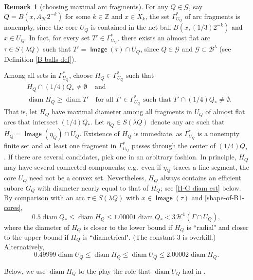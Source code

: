 \documentclass[12pt]{amsart}
\numberwithin{equation}{section}
\theoremstyle{plain}
\theoremstyle{definition}
\newtheorem{remark}[theorem]{Remark}
\def\ZZ{\mathbb{Z}}
\newcommand{\diam}{\mathop\mathrm{diam}\nolimits}
\newcommand{\Haus}{\mathcal{H}}
\newcommand{\Image}{\mathop\mathsf{Image}\nolimits}
\numberwithin{figure}{section}
\begin{document}
\begin{remark}[choosing maximal arc fragments] \label{r:maximal-fragments}
 For any $Q\in\mathscr{G}$, say $Q=B(x,A_\mathscr{H}2^{-k})$ for some $k\in\ZZ$ and $x\in X_k$, the set $\Gamma^*_{U_Q}$ of arc fragments is nonempty, since the core $U_Q$ is contained in the net ball $B(x,(1/3)2^{-k})$ and $x\in U_Q$. In fact, for every set $T'\in\Gamma^*_{U_Q}$, there exists an almost flat arc $\tau\in S(\lambda Q)$ such that $T'=\Image(\tau)\cap U_Q$, since $Q\in\mathscr{G}$ and $\mathscr{G}\subset\mathscr{B}^\lambda$ (see Definition \ref{B-balls-def}).

Among all sets in $\Gamma_{U_Q}^*$, choose $H_Q\in\Gamma^*_{U_Q}$ such that \begin{equation}\begin{split}\label{e:HQ}
&H_Q \cap (1/4)Q_* \neq \emptyset\quad\,\text{and}  \\
&\diam H_Q \geq \diam T' \quad\text{for all }T'\in\Gamma^*_{U_Q} \text{ such that } T' \cap (1/4)Q_* \neq \emptyset.\end{split}\end{equation} That is, let $H_Q$ have maximal diameter among all fragments in $U_Q$ of almost flat arcs that intersect $(1/4)Q_*$. Let $\eta_Q\in S(\lambda Q)$ denote any arc such that $H_Q=\Image(\eta_Q)\cap U_Q$. Existence of $H_Q$ is immediate, as $\Gamma^*_{U_Q}$ is a nonempty finite set and at least one fragment in $\Gamma^*_{U_Q}$ passes through the center of $(1/4)Q_*$. If there are several candidates, pick one in an arbitrary fashion. In principle, $H_Q$ may have several connected components; e.g.~even if $\eta_Q$ traces a line segment, the core $U_Q$ need not be a convex set. Nevertheless, $H_Q$ always contains an efficient subarc $G_Q$ with diameter nearly equal to that of $H_Q$; see \eqref{H-G diam est} below. By comparison with an arc $\tau\in S(\lambda Q)$ with $x\in \Image(\tau)$ and \eqref{shape-of-B1-cores}, \begin{equation}\label{HQ-bounds} 0.5\diam Q_*\leq \diam H_Q \leq 1.00001\diam Q_*<3\Haus^1(\Gamma\cap U_Q),\end{equation} where the diameter of $H_Q$ is closer to the lower bound if $H_Q$ is ``radial" and closer to the upper bound if $H_Q$ is ``diametrical". (The constant 3 is overkill.) Alternatively, \begin{equation} \label{HQ-bounds-2} 0.49999 \diam U_Q \leq \diam H_Q \leq \diam U_Q\leq 2.00002\diam H_Q.\end{equation}

Below, we use $\diam H_Q$ to the play the role that $\diam U_Q$ had in \cite{Schul-Hilbert}.
\end{remark}
\end{document}

